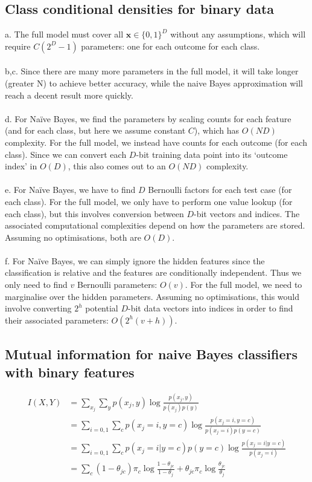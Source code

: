 \documentclass{article}
\begin{document}
\subsection{Class conditional densities for binary data}
a. The full model must cover all $\mathbf{x} \in \{0,1\}^D$ without any assumptions, which will require $C(2^D-1)$ parameters: one for each outcome for each class.\\\\
b,c. Since there are many more parameters in the full model, it will take longer (greater N) to achieve better accuracy, while the naive Bayes approximation will reach a decent result more quickly.\\\\
d. For Na\"ive Bayes, we find the parameters by scaling counts for each feature (and for each class, but here we assume constant $C$), which has $O(ND)$ complexity. For the full model, we instead have counts for each outcome (for each class). Since we can convert each $D$-bit training data point into its `outcome index' in $O(D)$, this also comes out to an $O(ND)$ complexity.\\\\
e. For Na\"ive Bayes, we have to find $D$ Bernoulli factors for each test case (for each class). For the full model, we only have to perform one value lookup (for each class), but this involves conversion between $D$-bit vectors and indices. The associated computational complexities depend on how the parameters are stored. Assuming no optimisations, both are $O(D)$.\\\\
f. For Na\"ive Bayes, we can simply ignore the hidden features since the classification is relative and the features are conditionally independent. Thus we only need to find $v$ Bernoulli parameters: $O(v)$. For the full model, we need to marginalise over the hidden parameters. Assuming no optimisations, this would involve converting $2^h$ potential $D$-bit data vectors into indices in order to find their associated parameters: $O(2^h(v+h))$.

\subsection{Mutual information for naive Bayes classifiers with binary features}
\begin{align*}
I(X,Y) &= \sum_{x_j} \sum_y p(x_j,y) \log\frac{p(x_j,y)}{p(x_j)p(y)}\\
&= \sum_{i=0,1} \sum_c p(x_j=i,y=c) \log\frac{p(x_j=i,y=c)}{p(x_j=i)p(y=c)}\\
&= \sum_{i=0,1} \sum_c p(x_j=i|y=c)p(y=c) \log\frac{p(x_j=i|y=c)}{p(x_j=i)}\\
&= \sum_c (1-\theta_{jc}) \pi_c \log\frac{1-\theta_{jc}}{1-\theta_j} + \theta_{jc} \pi_c \log\frac{\theta_{jc}}{\theta_j}
\end{align*}
\end{document}
